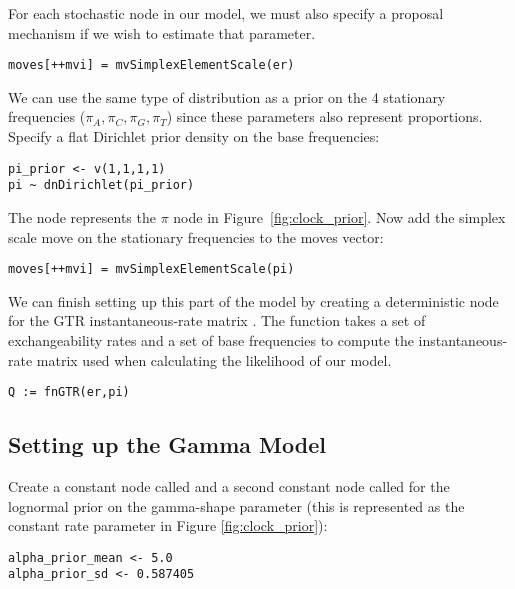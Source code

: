 For each stochastic node in our model, we must also specify a proposal mechanism if we wish to estimate that parameter. 
{\tt\small \begin{snugshade*}
\begin{lstlisting}
moves[++mvi] = mvSimplexElementScale(er) 
\end{lstlisting}
\end{snugshade*}}

We can use the same type of distribution as a prior on the 4 stationary frequencies ($\pi_A, \pi_C, \pi_G, \pi_T$) since these parameters also represent proportions. 
Specify a flat Dirichlet prior density on the base frequencies:
{\tt \begin{snugshade*}
\begin{lstlisting}
pi_prior <- v(1,1,1,1) 
pi ~ dnDirichlet(pi_prior)
\end{lstlisting}
\end{snugshade*}}

The node  represents the $\pi$ node in Figure~\ref{fig:clock_prior}.
Now add the simplex scale move on the stationary frequencies to the moves vector:
{\tt \small \begin{snugshade*}
\begin{lstlisting}
moves[++mvi] = mvSimplexElementScale(pi)  
\end{lstlisting}
\end{snugshade*}}

We can finish setting up this part of the model by creating a deterministic node for the GTR instantaneous-rate matrix . 
The  function takes a set of exchangeability rates and a set of base frequencies to compute the instantaneous-rate matrix used when calculating the likelihood of our model.
{\tt \begin{snugshade*}
\begin{lstlisting}
Q := fnGTR(er,pi)
\end{lstlisting}
\end{snugshade*}}


\subsection{Setting up the Gamma Model}

Create a constant node called  and a second constant node called  for the lognormal prior on the gamma-shape parameter (this is represented as the constant rate parameter in Figure \ref{fig:clock_prior}):
{\tt\begin{snugshade*}
\begin{lstlisting}
alpha_prior_mean <- 5.0
alpha_prior_sd <- 0.587405
\end{lstlisting}
\end{snugshade*}}

